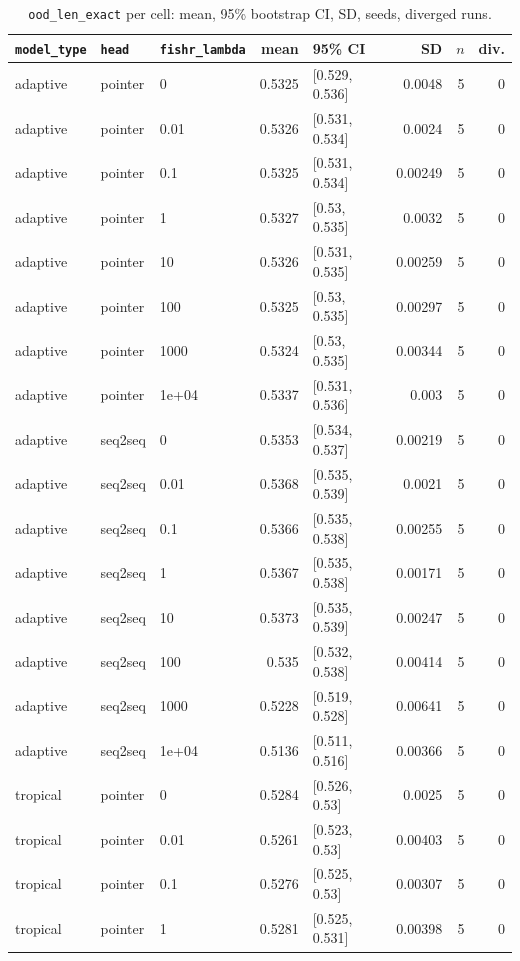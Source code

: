 \documentclass[10pt]{article}
\begin{document}
{\small
\begin{longtable}{lllrlrrr}
\caption{\texttt{ood\_len\_exact} per cell: mean, 95\% bootstrap CI, SD, seeds, diverged runs.}\label{tab:summary-ood_len_exact}\\
\toprule
\texttt{model\_type} & \texttt{head} & \texttt{fishr\_lambda} & mean & 95\% CI & SD & $n$ & div.\\
\midrule
\endhead
adaptive & pointer & 0 & 0.5325 & [0.529, 0.536] & 0.0048 & 5 & 0\\
adaptive & pointer & 0.01 & 0.5326 & [0.531, 0.534] & 0.0024 & 5 & 0\\
adaptive & pointer & 0.1 & 0.5325 & [0.531, 0.534] & 0.00249 & 5 & 0\\
adaptive & pointer & 1 & 0.5327 & [0.53, 0.535] & 0.0032 & 5 & 0\\
adaptive & pointer & 10 & 0.5326 & [0.531, 0.535] & 0.00259 & 5 & 0\\
adaptive & pointer & 100 & 0.5325 & [0.53, 0.535] & 0.00297 & 5 & 0\\
adaptive & pointer & 1000 & 0.5324 & [0.53, 0.535] & 0.00344 & 5 & 0\\
adaptive & pointer & 1e+04 & 0.5337 & [0.531, 0.536] & 0.003 & 5 & 0\\
adaptive & seq2seq & 0 & 0.5353 & [0.534, 0.537] & 0.00219 & 5 & 0\\
adaptive & seq2seq & 0.01 & 0.5368 & [0.535, 0.539] & 0.0021 & 5 & 0\\
adaptive & seq2seq & 0.1 & 0.5366 & [0.535, 0.538] & 0.00255 & 5 & 0\\
adaptive & seq2seq & 1 & 0.5367 & [0.535, 0.538] & 0.00171 & 5 & 0\\
adaptive & seq2seq & 10 & 0.5373 & [0.535, 0.539] & 0.00247 & 5 & 0\\
adaptive & seq2seq & 100 & 0.535 & [0.532, 0.538] & 0.00414 & 5 & 0\\
adaptive & seq2seq & 1000 & 0.5228 & [0.519, 0.528] & 0.00641 & 5 & 0\\
adaptive & seq2seq & 1e+04 & 0.5136 & [0.511, 0.516] & 0.00366 & 5 & 0\\
tropical & pointer & 0 & 0.5284 & [0.526, 0.53] & 0.0025 & 5 & 0\\
tropical & pointer & 0.01 & 0.5261 & [0.523, 0.53] & 0.00403 & 5 & 0\\
tropical & pointer & 0.1 & 0.5276 & [0.525, 0.53] & 0.00307 & 5 & 0\\
tropical & pointer & 1 & 0.5281 & [0.525, 0.531] & 0.00398 & 5 & 0\\

\end{longtable}}
\end{document}
